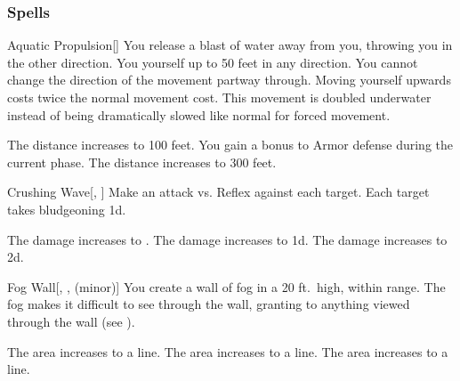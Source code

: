 \subsubsection{Spells}


\lowercase{\hypertarget{spell:Aquatic Propulsion}{}}\label{spell:Aquatic Propulsion}
\begin{freeability}[Rank 1]{\hypertarget{spell:Aquatic Propulsion}{Aquatic Propulsion}}[]
You release a blast of water away from you, throwing you in the other direction.
You  yourself up to 50 feet in any direction.
You cannot change the direction of the movement partway through.
Moving yourself upwards costs twice the normal movement cost.
This movement is doubled underwater instead of being dramatically slowed like normal for forced movement.

\rankline
{} The distance increases to 100 feet.
 You gain a  bonus to Armor defense during the current phase.
 The distance increases to 300 feet.

\end{freeability}
\vspace{0.25em}



\lowercase{\hypertarget{spell:Crushing Wave}{}}\label{spell:Crushing Wave}
\begin{freeability}[Rank 1]{\hypertarget{spell:Crushing Wave}{Crushing Wave}}[, ]
Make an attack vs. Reflex against each target.
\hit Each target takes bludgeoning  \minus1d.

\rankline
{} The damage increases to .
 The damage increases to  \plus1d.
 The damage increases to  \plus2d.

\end{freeability}
\vspace{0.25em}



\lowercase{\hypertarget{spell:Fog Wall}{}}\label{spell:Fog Wall}
\begin{freeability}[Rank 1]{\hypertarget{spell:Fog Wall}{Fog Wall}}[, ,  (minor)]
\targetrule
You create a wall of fog in a 20 ft.\ high, \arealarge {} within \rngmed range.
The fog makes it difficult to see through the wall, granting  to anything viewed through the wall (see ).

\rankline
{} The area increases to a \arealarge line.
 The area increases to a \areahuge line.
 The area increases to a \areaext line.

\end{freeability}
\vspace{0.25em}



